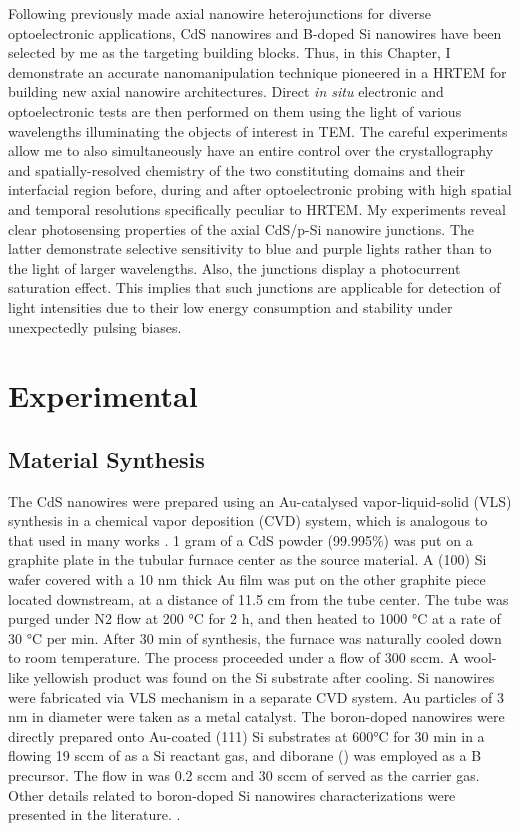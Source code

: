 Following previously made axial nanowire heterojunctions for diverse optoelectronic applications, CdS nanowires and B-doped Si nanowires have been selected by me as the targeting building blocks. Thus, in this Chapter, I demonstrate an accurate nanomanipulation technique pioneered in a HRTEM for building new axial nanowire architectures. Direct \emph{in situ} electronic and optoelectronic tests are then performed on them using the light of various wavelengths illuminating the objects of interest in TEM. The careful experiments allow me to also simultaneously have an entire control over the crystallography and spatially-resolved chemistry of the two constituting domains and their interfacial region before, during and after optoelectronic probing with high spatial and temporal resolutions specifically peculiar to HRTEM. 
My experiments reveal clear photosensing properties of the axial CdS/p-Si nanowire junctions. The latter demonstrate selective sensitivity to blue and purple lights rather than to the light of larger wavelengths. Also, the junctions display a photocurrent saturation effect. This implies that such junctions are applicable for detection of light intensities due to their low energy consumption and stability under unexpectedly pulsing biases. 
\vfill %

\section{Experimental}
\subsection{Material Synthesis}
The CdS nanowires were prepared using an Au-catalysed vapor-liquid-solid (VLS) synthesis  in a chemical vapor deposition (CVD) system, which is analogous to that used in many works \cite{zhang2014photosensing,577926461}. 1 gram of a CdS powder (99.995\%) was put on a graphite plate in the tubular furnace center as the source material. A (100) Si wafer covered with a 10 nm thick Au film was put on the other graphite piece located downstream, at a distance of 11.5 cm from the tube center. The tube was purged under N2 flow at 200 °C for 2 h, and then heated to 1000 °C at a rate of 30 °C per min. After 30 min of synthesis, the furnace was naturally cooled down to room temperature. The process proceeded under a  flow of 300 sccm. A wool-like yellowish product was found on the Si substrate after cooling. 
Si nanowires were fabricated via VLS mechanism in a separate CVD system. Au particles of 3 nm in diameter were taken as a metal catalyst. The boron-doped nanowires were directly prepared onto Au-coated (111) Si substrates at 600°C for 30 min in a flowing 19 sccm of  as a Si reactant gas, and diborane () was employed as a B precursor. The  flow in  was 0.2 sccm and 30 sccm of  served as the carrier gas. Other details related to boron-doped Si nanowires characterizations were presented in the literature. \cite{577926462,577926464,577926465}.

